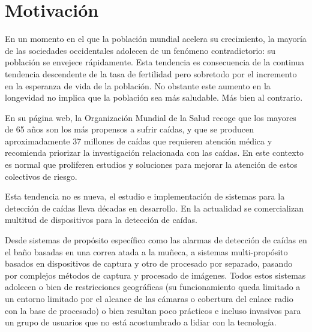 %
\begin{comment}
Resumen esquemático de cada una de las partes del trabajo. Leer esta sección ha de dar una idea clara de lo que se pretendía y las conclusiones a las que se han llegado y del proceso seguido. Es uno de los capítulos mas importantes
\end{comment}

\section{Motivación}\label{sec:intro:motivación}

\begin{comment}
Problema a tratar, posibles causas, relevancia del problema
\end{comment}

En un momento en el que la población mundial acelera su crecimiento, la mayoría de las sociedades occidentales adolecen de un fenómeno contradictorio: su población se envejece rápidamente. Esta tendencia es consecuencia de la continua tendencia descendente de la tasa de fertilidad pero sobretodo por el incremento en la esperanza de vida de la población. No obstante este aumento en la longevidad no implica que la población sea más saludable. Más bien al contrario.

En su página web, la Organización Mundial de la Salud recoge que los mayores de 65 años son los más propensos a sufrir caídas, y que se producen aproximadamente 37 millones de caídas que requieren atención médica y recomienda priorizar la investigación relacionada con las caídas\cite{FactsFalls2018}. En este contexto es normal que proliferen estudios y soluciones para mejorar la atención de estos colectivos de riesgo.

Esta tendencia no es nueva, el estudio e implementación de sistemas para la detección de caídas lleva décadas en desarrollo\cite{fallindex00, Chen2005, Noury2007, Bourke2006}. En la actualidad se comercializan multitud de dispositivos para la detección de caídas.

Desde sistemas de propósito específico como las alarmas de detección de caídas en el baño basadas en una correa atada a la muñeca, a sistemas multi-propósito basados en dispositivos de captura y otro de procesado por separado, pasando por complejos métodos de captura y procesado de imágenes. Todos estos sistemas adolecen o bien de restricciones geográficas (su funcionamiento queda limitado a un entorno limitado por el alcance de las cámaras o cobertura del enlace radio con la base de procesado) o bien resultan poco prácticos e incluso invasivos para un grupo de usuarios que no está acostumbrado a lidiar con la tecnología.

